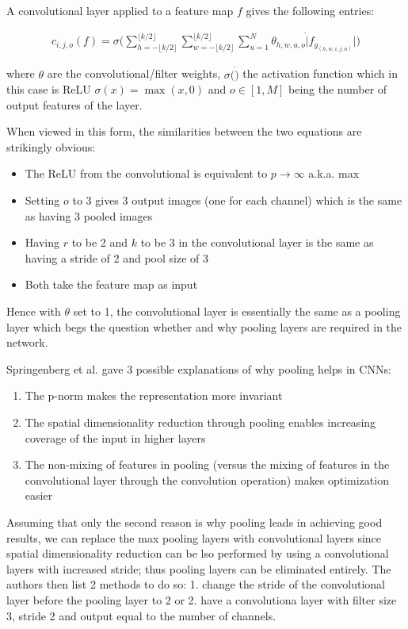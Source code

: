 A convolutional layer applied to a feature map $f$ gives the following entries:

\begin{align}
c_{i,j,o}(f) = \sigma \bigg ( \sum_{h = - \lfloor k/2 \rfloor}^{\lfloor k/2 \rfloor} \sum_{w = - \lfloor k/2 \rfloor}^{\lfloor k/2 \rfloor} \sum_{u=1}^N \theta_{h,w,u,o} \dot |f_{g_{(h,w,i,j,u)}}|\bigg ) 
\end{align}

\noindent where $\theta$ are the convolutional/filter weights, $\sigma(\dot)$ the activation function which in this case is ReLU $\sigma(x) = \max(x, 0)$ and $o \in [1, M]$ being the number of output features of the layer.

When viewed in this form, the similarities between the two equations are strikingly obvious:
\begin{itemize}
\item The ReLU from the convolutional is equivalent to $p \rightarrow \infty$ a.k.a. max
\item Setting $o$ to 3 gives 3 output images (one for each channel) which is the same as having 3 pooled images
\item Having $r$ to be 2 and $k$ to be 3 in the convolutional layer is the same as having a stride of 2 and pool size of 3
\item Both take the feature map as input
\end{itemize}
Hence with $\theta$ set to 1, the convolutional layer is essentially the same as a pooling layer which begs the question whether and why pooling layers are required in the network.

Springenberg et al. gave 3 possible explanations of why pooling helps in CNNs:
\begin{enumerate}
\item The p-norm makes the representation more invariant
\item The spatial dimensionality reduction through pooling enables increasing coverage of the input in higher layers
\item The non-mixing of features in pooling (versus the mixing of features in the convolutional layer through the convolution operation) makes optimization easier
\end{enumerate}

Assuming that only the second reason is why pooling leads in achieving good results, we can replace the max pooling layers with convolutional layers since spatial dimensionality reduction can be lso performed by using a convolutional layers with increased stride; thus pooling layers can be eliminated entirely. The authors then list 2 methods to do so: 1. change the stride of the convolutional layer before the pooling layer to 2 or 2. have a convolutiona layer with filter size 3, stride 2 and output equal to the number of channels.

